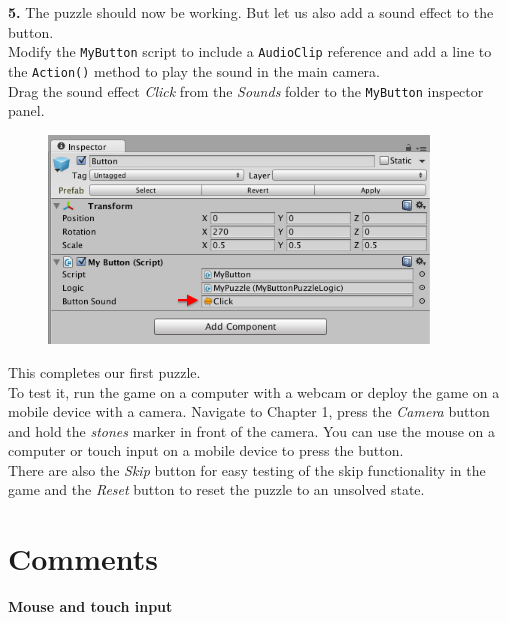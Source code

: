 \documentclass[a4paper]{article}
\begin{document}
\textbf{5.} The puzzle should now be working. But let us also add a sound effect to the button.\\

Modify the \texttt{MyButton} script to include a \texttt{AudioClip} reference and add a line to the \texttt{Action()} method to play the sound in the main camera.\\



Drag the sound effect \textit{Click} from the \textit{Sounds} folder to the \texttt{MyButton} inspector panel.\\

\begin{figure}[H]
\centering
\includegraphics[width=0.9\textwidth]{figures/4-3.png}
\end{figure}

This completes our first puzzle.\\

To test it, run the game on a computer with a webcam or deploy the game on a mobile device with a camera. Navigate to Chapter 1, press the \textit{Camera} button and hold the \textit{stones} marker in front of the camera. You can use the mouse on a computer or touch input on a mobile device to press the button.\\

There are also the \textit{Skip} button for easy testing of the skip functionality in the game and the \textit{Reset} button to reset the puzzle to an unsolved state.

\section{Comments}

\textbf{Mouse and touch input}\\
\end{document}
